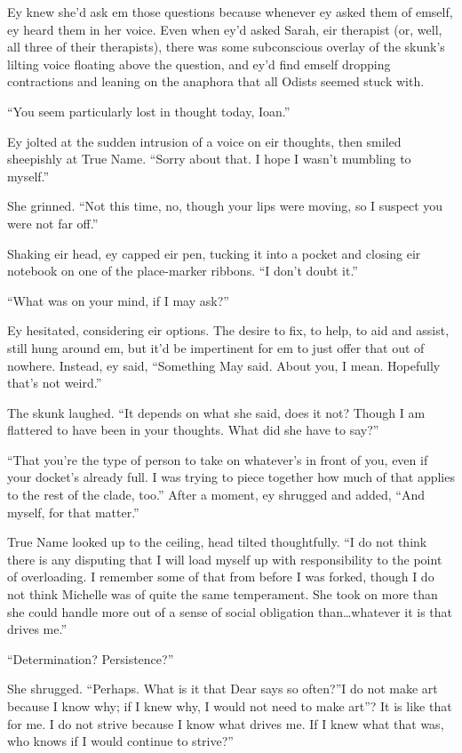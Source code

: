Ey knew she'd ask em those questions because whenever ey asked them of emself, ey heard them in her voice. Even when ey'd asked Sarah, eir therapist (or, well, all three of their therapists), there was some subconscious overlay of the skunk's lilting voice floating above the question, and ey'd find emself dropping contractions and leaning on the anaphora that all Odists seemed stuck with.

``You seem particularly lost in thought today, Ioan.''

Ey jolted at the sudden intrusion of a voice on eir thoughts, then smiled sheepishly at True Name. ``Sorry about that. I hope I wasn't mumbling to myself.''

She grinned. ``Not this time, no, though your lips were moving, so I suspect you were not far off.''

Shaking eir head, ey capped eir pen, tucking it into a pocket and closing eir notebook on one of the place-marker ribbons. ``I don't doubt it.''

``What was on your mind, if I may ask?''

Ey hesitated, considering eir options. The desire to fix, to help, to aid and assist, still hung around em, but it'd be impertinent for em to just offer that out of nowhere. Instead, ey said, ``Something May said. About you, I mean. Hopefully that's not weird.''

The skunk laughed. ``It depends on what she said, does it not? Though I am flattered to have been in your thoughts. What did she have to say?''

``That you're the type of person to take on whatever's in front of you, even if your docket's already full. I was trying to piece together how much of that applies to the rest of the clade, too.'' After a moment, ey shrugged and added, ``And myself, for that matter.''

True Name looked up to the ceiling, head tilted thoughtfully. ``I do not think there is any disputing that I will load myself up with responsibility to the point of overloading. I remember some of that from before I was forked, though I do not think Michelle was of quite the same temperament. She took on more than she could handle more out of a sense of social obligation than\ldots whatever it is that drives me.''

``Determination? Persistence?''

She shrugged. ``Perhaps. What is it that Dear says so often?''I do not make art because I know why; if I knew why, I would not need to make art''? It is like that for me. I do not strive because I know what drives me. If I knew what that was, who knows if I would continue to strive?''

